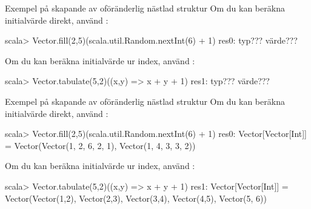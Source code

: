 \begin{Slide}{Exempel på skapande av oföränderlig nästlad struktur}\SlideFontSmall
Om du kan beräkna initialvärde direkt, använd :\\
{\SlideFontTiny{}}
\begin{REPL}
scala> Vector.fill(2,5)(scala.util.Random.nextInt(6) + 1)
res0:
  typ???
  värde???

\end{REPL}
Om du kan beräkna initialvärde ur index, använd :\\
{\SlideFontTiny{}}
\begin{REPL}
scala> Vector.tabulate(5,2)((x,y) => x + y + 1)
res1:
  typ???
  värde???

\end{REPL}
\end{Slide}

\begin{Slide}{Exempel på skapande av oföränderlig nästlad struktur}\SlideFontSmall
Om du kan beräkna initialvärde direkt, använd :\\
{\SlideFontTiny{}}
\begin{REPL}
scala> Vector.fill(2,5)(scala.util.Random.nextInt(6) + 1)
res0: Vector[Vector[Int]] =
  Vector(Vector(1, 2, 6, 2, 1), Vector(1, 4, 3, 3, 2))

\end{REPL}
Om du kan beräkna initialvärde ur index, använd :\\
{\SlideFontTiny{}}
\begin{REPL}
scala> Vector.tabulate(5,2)((x,y) => x + y + 1)
res1: Vector[Vector[Int]] =
  Vector(Vector(1,2), Vector(2,3), Vector(3,4), Vector(4,5), Vector(5,	6))

\end{REPL}
\end{Slide}



